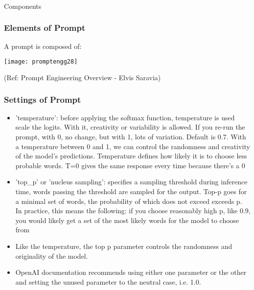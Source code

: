 \begin{frame}[fragile]\frametitle{}
\begin{center}
{\Large Components}
\end{center}
\end{frame}



\begin{frame}[fragile]\frametitle{Elements of Prompt}

A prompt is composed of:

\begin{center}
\texttt{[image: promptengg28]}

{\tiny (Ref: Prompt Engineering Overview - Elvis Saravia)}

\end{center}		
		
\end{frame}


\begin{frame}[fragile]\frametitle{Settings of Prompt}

\begin{itemize}
\item 'temperature':  before applying the softmax function, temperature is used scale the logits. With it, creativity or variability is allowed. If you re-run the prompt, with 0, no change, but with 1, lots of variation. Default is 0.7. With a temperature between 0 and 1, we can control the randomness and creativity of the model's predictions. Temperature defines how likely it is to choose less probable words. T=0 gives the same response every time because there's a 0%
\item 'top\_p' or 'nucleus sampling': specifies a sampling threshold during inference time, words passing the threshold are sampled for the output. Top-p goes for a minimal set of words, the probability of which does not exceed exceeds p. In practice, this means the following: if you choose reasonably high p, like 0.9, you would likely get a set of the most likely words for the model to choose from
\item Like the temperature, the top p parameter controls the randomness and originality of the model.
\item OpenAI documentation recommends using either one parameter or the other and setting the unused parameter to the neutral case, i.e. 1.0.
\end{itemize}
		
\end{frame}




